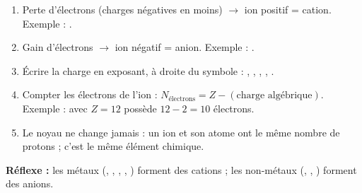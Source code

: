 \documentclass[11pt]{article}
\newcommand{\cle}[1]{{\popxbold\color{popdark}#1}}
\begin{document}
\begin{methode}
\begin{enumerate}
\item \cle{Perte d'électrons} (charges négatives en moins) $\rightarrow$ ion positif = \cle{cation}. Exemple : .
\item \cle{Gain d'électrons} $\rightarrow$ ion négatif = \cle{anion}. Exemple : .
\item \cle{Écrire la charge} en exposant, à droite du symbole : , , , , .
\item \cle{Compter les électrons de l'ion} : $N_{\text{électrons}} = Z - (\text{charge algébrique})$. Exemple :  avec $Z = 12$ possède $12 - 2 = 10$ électrons.
\item \cle{Le noyau ne change jamais} : un ion et son atome ont le même nombre de protons ; c'est le même élément chimique.
\end{enumerate}
\textbf{Réflexe :} les métaux (, , , , ) forment des cations ; les non-métaux (, , ) forment des anions.
\end{methode}
\end{document}
